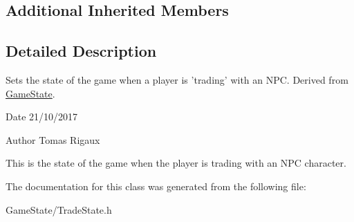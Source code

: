 \subsection*{Additional Inherited Members}


\subsection{Detailed Description}
Sets the state of the game when a player is 'trading' with an N\-P\-C. Derived from \hyperlink{classGameState}{Game\-State}. 

\begin{DoxyDate}{Date}
21/10/2017 
\end{DoxyDate}
\begin{DoxyAuthor}{Author}
Tomas Rigaux
\end{DoxyAuthor}
This is the state of the game when the player is trading with an N\-P\-C character. 

The documentation for this class was generated from the following file\-:\begin{DoxyCompactItemize}
\item 
Game\-State/Trade\-State.\-h\end{DoxyCompactItemize}
